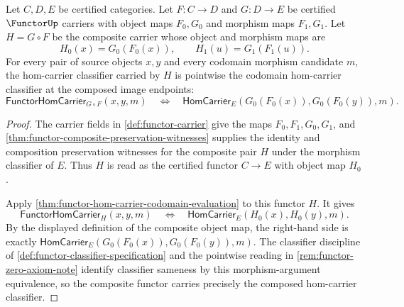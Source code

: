 \begin{theorem}
\label{thm:functor-composite-hom-carrier-classifier}
Let $C,D,E$ be certified categories. Let $F:C\to D$ and $G:D\to E$ be certified $\FunctorUp$ carriers with object maps $F_0,G_0$ and morphism maps $F_1,G_1$. Let $H=G\circ F$ be the composite carrier whose object and morphism maps are
$$
H_0(x)=G_0(F_0(x)),
\qquad
H_1(u)=G_1(F_1(u)).
$$
For every pair of source objects $x,y$ and every codomain morphism candidate $m$, the hom-carrier classifier carried by $H$ is pointwise the codomain hom-carrier classifier at the composed image endpoints:
$$
\mathsf{FunctorHomCarrier}_{G\circ F}(x,y,m)
\quad\Longleftrightarrow\quad
\mathsf{HomCarrier}_{E}(G_0(F_0(x)),G_0(F_0(y)),m).
$$
\end{theorem}
\begin{proof}
The carrier fields in \autoref{def:functor-carrier} give the maps $F_0,F_1,G_0,G_1$, and \autoref{thm:functor-composite-preservation-witnesses} supplies the identity and composition preservation witnesses for the composite pair $H$ under the morphism classifier of $E$. Thus $H$ is read as the certified functor $C\to E$ with object map $H_0$.

Apply \autoref{thm:functor-hom-carrier-codomain-evaluation} to this functor $H$. It gives
$$
\mathsf{FunctorHomCarrier}_{H}(x,y,m)
\quad\Longleftrightarrow\quad
\mathsf{HomCarrier}_{E}(H_0(x),H_0(y),m).
$$
By the displayed definition of the composite object map, the right-hand side is exactly $\mathsf{HomCarrier}_{E}(G_0(F_0(x)),G_0(F_0(y)),m)$. The classifier discipline of \autoref{def:functor-classifier-specification} and the pointwise reading in \autoref{rem:functor-zero-axiom-note} identify classifier sameness by this morphism-argument equivalence, so the composite functor carries precisely the composed hom-carrier classifier.
\end{proof}

